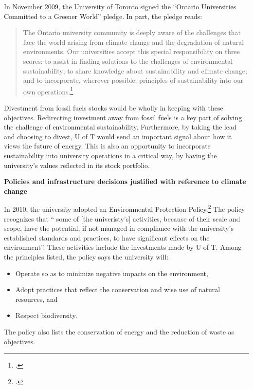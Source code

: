 \documentclass[10pt]{article}
\begin{document}
In November 2009, the University of Toronto signed the ``Ontario Universities Committed to a Greener World'' pledge. In part, the pledge reads:
\begin{quote}
The Ontario university community is deeply aware of the challenges that face the world arising from climate change and the degradation of natural environments. Our universities accept this special responsibility on three scores: to assist in finding solutions to the challenges of environmental sustainability; to share knowledge about sustainability and climate change; and to incorporate, wherever possible, principles of sustainability into our own operations.\footcite[][]{OntarioPledge}
\end{quote}
Divestment from fossil fuels stocks would be wholly in keeping with these objectives.
Redirecting investment away from fossil fuels is a key part of solving the challenge of environmental sustainability.
Furthermore, by taking the lead and choosing to divest, U of T would send an important signal about how it views the future of energy.
This is also an opportunity to incorporate sustainability into university operations in a critical way, by having the university's values reflected in its stock portfolio.



\textbf{Policies and infrastructure decisions justified with reference to climate change}
\label{UofTActions}






In 2010, the university adopted an Environmental Protection Policy.\footcite[][]{UTEnvProtectionPolicy}
The policy recognizes that `` some of [the univeristy's] activities, because of their scale and scope, have the potential, if not managed in compliance with the university’s established standards and practices, to have significant effects on the environment''.
These activities include the investments made by U of T.
Among the principles listed, the policy says the university will:
\begin{itemize}
	\item Operate so as to minimize negative impacts on the environment,
	\item Adopt practices that reflect the conservation and wise use of natural resources, and
	\item Respect biodiversity.
\end{itemize}
The policy also lists the conservation of energy and the reduction of waste as objectives.
\end{document}
